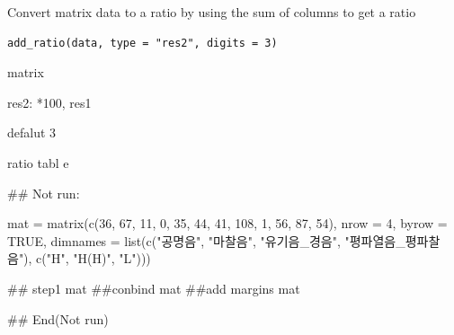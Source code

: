 \documentclass[a4paper]{book}
\begin{document}
%
\begin{Description}
Convert matrix data to a ratio by using the sum of columns to get a ratio
\end{Description}
%
\begin{Usage}
\begin{verbatim}
add_ratio(data, type = "res2", digits = 3)
\end{verbatim}
\end{Usage}
%
\begin{Arguments}
\begin{ldescription}
\item[\code{data}] matrix

\item[\code{type}] res2: *100, res1

\item[\code{digits}] defalut 3
\end{ldescription}
\end{Arguments}
%
\begin{Value}
ratio tabl e
\end{Value}
%
\begin{Examples}
\begin{ExampleCode}

\#\# Not run: 


mat = matrix(c(36, 67, 11,
          0, 35, 44,
         41, 108, 1,
          56, 87, 54),
           nrow = 4, byrow = TRUE,
 dimnames = list(c("공명음", "마찰음",
                   "유기음_경음", "평파열음_평파찰음"),
                    c("H", "H(H)", "L")))

## step1
  mat %
##conbind
 mat %
##add margins
 mat %


## End(Not run)

\end{ExampleCode}
\end{Examples}
\end{document}
